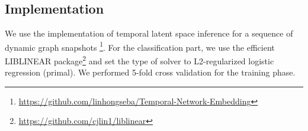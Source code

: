 




\subsection{Implementation}

We use the implementation of temporal latent space inference for a sequence of dynamic graph snapshots \footnote{\url{https://github.com/linhongseba/Temporal-Network-Embedding}}\cite{Zhu2016}.
 For the classification part, we use the efficient LIBLINEAR \cite{fan2008liblinear} package\footnote{\url{https://github.com/cjlin1/liblinear}} and set the type of solver to L2-regularized logistic regression (primal). %
We performed 5-fold cross validation for the training phase.






